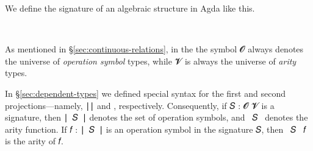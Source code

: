 
We define the signature of an algebraic structure in Agda like this.
\ccpad
\begin{code}%
\>[0]\AgdaSpace{}%
\AgdaSymbol{:}\AgdaSpace{}%
\AgdaSymbol{(}\AgdaSpace{}%
\AgdaSpace{}%
\AgdaSymbol{:}\AgdaSpace{}%
\AgdaSymbol{)}\AgdaSpace{}%
\AgdaSpace{}%
\AgdaSymbol{(}\AgdaSpace{}%
\AgdaSpace{}%
\AgdaSymbol{)}\AgdaSpace{}%
\AgdaSpace{}%
\<%
\\
\>[0]\AgdaSpace{}%
\AgdaSpace{}%
\AgdaSpace{}%
\AgdaSymbol{=}\AgdaSpace{}%
\AgdaSpace{}%
\AgdaSpace{}%
\AgdaSpace{}%
\AgdaSpace{}%
\AgdaSpace{}%
\AgdaFunction{,}\AgdaSpace{}%
\AgdaSymbol{(}\AgdaSpace{}%
\AgdaSpace{}%
\AgdaSpace{}%
\AgdaSymbol{)}\<%
\end{code}
\ccpad
As mentioned in \S\ref{sec:continuous-relations}, in the \ualib the symbol 𝓞 always denotes the universe of \emph{operation symbol} types, while 𝓥 is always the universe of \emph{arity} types.

In \S\ref{sec:dependent-types} we defined special syntax for the first and second projections---namely, \af ∣\au\af ∣ and \au{}, respectively. Consequently, if \ab 𝑆 \as :  \ab 𝓞 \ab 𝓥 is a signature, then \af ∣~\ab 𝑆~\af ∣ denotes the set of operation symbols, and ~\ab 𝑆~ denotes the arity function. If \ab 𝑓 \as : \af ∣~\ab 𝑆~\af ∣ is an operation symbol in the signature \ab 𝑆, then ~\ab 𝑆~ \ab 𝑓 is the arity of \ab 𝑓.



